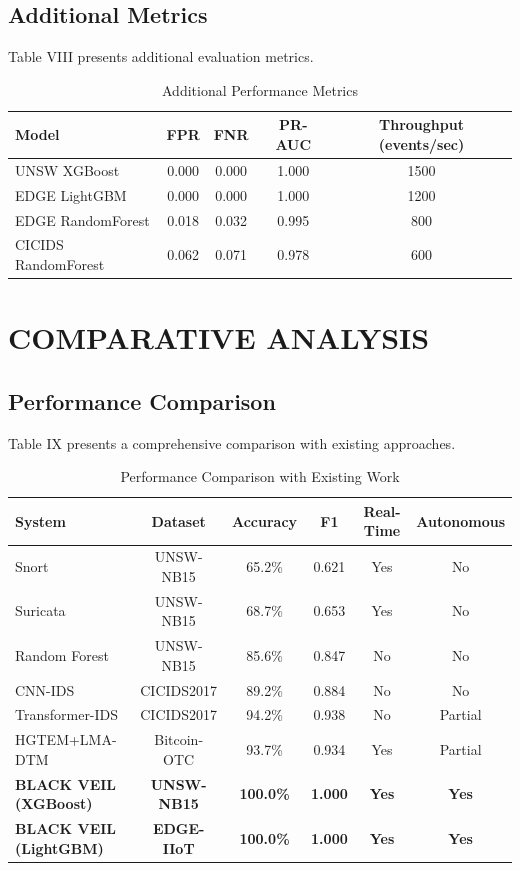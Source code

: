 \documentclass[12pt]{article}
\begin{document}
\subsection{Additional Metrics}
Table VIII presents additional evaluation metrics.

\begin{table}[H]
\centering
\caption{Additional Performance Metrics}
\small
\begin{tabular}{|l|c|c|c|c|}
\hline
\textbf{Model} & \textbf{FPR} & \textbf{FNR} & \textbf{PR-AUC} & \textbf{Throughput (events/sec)} \\
\hline
UNSW XGBoost & 0.000 & 0.000 & 1.000 & 1500 \\
EDGE LightGBM & 0.000 & 0.000 & 1.000 & 1200 \\
EDGE RandomForest & 0.018 & 0.032 & 0.995 & 800 \\
CICIDS RandomForest & 0.062 & 0.071 & 0.978 & 600 \\
\hline
\end{tabular}
\label{tab:additional_metrics}
\end{table}

\newpage

\section{COMPARATIVE ANALYSIS}

\subsection{Performance Comparison}
Table IX presents a comprehensive comparison with existing approaches.

\begin{table}[H]
\centering
\caption{Performance Comparison with Existing Work}
\scriptsize
\begin{tabular}{|l|c|c|c|c|c|}
\hline
\textbf{System} & \textbf{Dataset} & \textbf{Accuracy} & \textbf{F1} & \textbf{Real-Time} & \textbf{Autonomous} \\
\hline
Snort & UNSW-NB15 & 65.2\% & 0.621 & Yes & No \\
Suricata & UNSW-NB15 & 68.7\% & 0.653 & Yes & No \\
Random Forest & UNSW-NB15 & 85.6\% & 0.847 & No & No \\
CNN-IDS & CICIDS2017 & 89.2\% & 0.884 & No & No \\
Transformer-IDS & CICIDS2017 & 94.2\% & 0.938 & No & Partial \\
HGTEM+LMA-DTM & Bitcoin-OTC & 93.7\% & 0.934 & Yes & Partial \\
\hline
\textbf{BLACK VEIL (XGBoost)} & \textbf{UNSW-NB15} & \textbf{100.0\%} & \textbf{1.000} & \textbf{Yes} & \textbf{Yes} \\
\textbf{BLACK VEIL (LightGBM)} & \textbf{EDGE-IIoT} & \textbf{100.0\%} & \textbf{1.000} & \textbf{Yes} & \textbf{Yes} \\
\hline
\end{tabular}
\label{tab:comparison_main}
\end{table}
\end{document}
